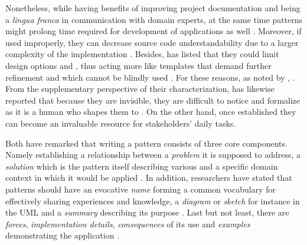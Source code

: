 Nonetheless, while having benefits of improving project documentation and being a \emph{lingua franca} in communication with domain experts, at the same time patterns might prolong time required for development of applications as well \parencite{Hossam2017}. 
Moreover, if used improperly, they can decrease source code understandability due to a larger complexity of the implementation \parencite{DeardenHCI2006}.
Besides, \textcite[2]{Hossam2017} has listed that they could limit design options and , thus acting more like templates that demand further refinement and which cannot be blindly used \parencite{Fowler2002}. 
For these reasons, as noted by \textcite[37]{Schmidt:1996:SP:236156.236164}, .
From the supplementary perspective of their characterization, \textcite[4]{PeterNorvig1996DesignProgramming} has likewise reported that because they are invisible, they are difficult to notice and formalize as it is a human who shapes them to .
On the other hand, once established they can become an invaluable resource for stakeholders' daily tasks.

Both \textcites{BruseDougals2002}{DongPan1998TheEngine} have remarked that writing a pattern consists of three core components. 
Namely establishing a relationship between a \emph{problem} it is supposed to address, a \emph{solution} which is the pattern itself describing various  and a specific domain context in which it would be applied \parencites[13]{GoF2002}{DobleMeszaros1997}. 
In addition, researchers have stated that patterns should have an evocative \emph{name} forming a common vocabulary for effectively sharing experiences and knowledge, a \emph{diagram} or \emph{sketch} for instance in the \ac{UML} and a \emph{summary} describing its purpose \parencites{Fowler2002}{HeffreMheer2006}{PeterNorvig1996DesignProgramming}.
Last but not least, there are \emph{forces}, \emph{implementation details}, \emph{consequences} of its use and \emph{examples} demonstrating the application \parencites{ChenHong2004}{Stefan2017}{GuerreroLuisFuller2001}{DobleMeszaros1997}. 

